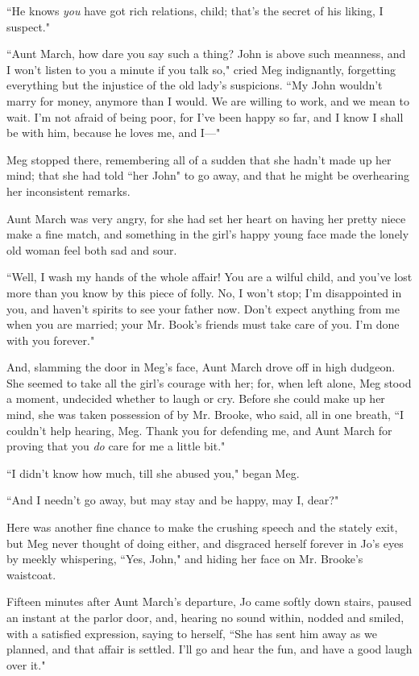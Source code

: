 ``He knows \emph{you} have got rich relations, child;
that's the secret of his liking, I suspect."

``Aunt March, how dare you say such a thing? John is above such meanness,
and I won't listen to you a minute if you talk so,"
cried Meg indignantly, forgetting everything but the injustice of the
old lady's suspicions. ``My John wouldn't
marry for money, anymore than I would. We are willing to work, and we
mean to wait. I'm not afraid of being poor, for
I've been happy so far, and I know I shall be with him,
because he loves me, and I---"

Meg stopped there, remembering all of a sudden that she
hadn't made up her mind; that she had told ``her John" to
go away, and that he might be overhearing her inconsistent remarks.

Aunt March was very angry, for she had set her heart on having her
pretty niece make a fine match, and something in the
girl's happy young face made the lonely old woman feel
both sad and sour.

``Well, I wash my hands of the whole affair! You are a wilful child, and
you've lost more than you know by this piece of folly.
No, I won't stop; I'm disappointed in
you, and haven't spirits to see your father now.
Don't expect anything from me when you are married; your
Mr. Book's friends must take care of you.
I'm done with you forever."

And, slamming the door in Meg's face, Aunt March drove
off in high dudgeon. She seemed to take all the girl's
courage with her; for, when left alone, Meg stood a moment, undecided
whether to laugh or cry. Before she could make up her mind, she was
taken possession of by Mr. Brooke, who said, all in one breath, ``I
couldn't help hearing, Meg. Thank you for defending me,
and Aunt March for proving that you \emph{do} care for me a little bit."

``I didn't know how much, till she abused you," began
Meg.

``And I needn't go away, but may stay and be happy, may
I, dear?"

Here was another fine chance to make the crushing speech and the stately
exit, but Meg never thought of doing either, and disgraced herself
forever in Jo's eyes by meekly whispering, ``Yes, John,"
and hiding her face on Mr. Brooke's waistcoat.

Fifteen minutes after Aunt March's departure, Jo came
softly down stairs, paused an instant at the parlor door, and, hearing
no sound within, nodded and smiled, with a satisfied expression, saying
to herself, ``She has sent him away as we planned, and that affair is
settled. I'll go and hear the fun, and have a good laugh
over it."

